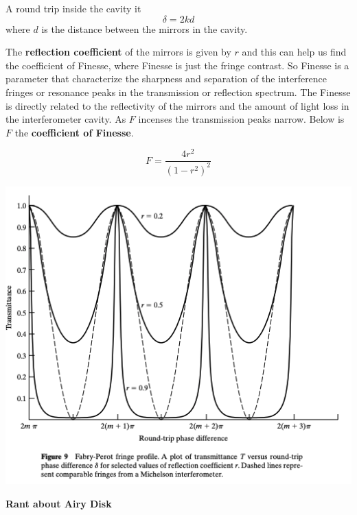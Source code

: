 \documentclass[10pt]{article}
\begin{document}
A round trip inside the cavity it
\[\delta = 2kd\]
where $d$ is the distance between the mirrors in the cavity.

\newblock

The \textbf{reflection coefficient} of the mirrors is given by $r$ and this can help us find the coefficient of Finesse, where Finesse is just the fringe contrast. So Finesse is a parameter that characterize the sharpness and separation of the interference fringes or resonance peaks in the transmission or reflection spectrum. The Finesse is directly related to the reflectivity of the mirrors and the amount of light loss in the interferometer cavity. As $F$ incenses the transmission peaks narrow. Below is $F$ the \textbf{coefficient of Finesse}.

\[F = \frac{4r^2}{(1-r^2)^2}\]

\begin{center}
    \includegraphics*[scale = .3]{imgs/transmission-peaks.png}
\end{center}

\textbf{Rant about Airy Disk}
\end{document}
